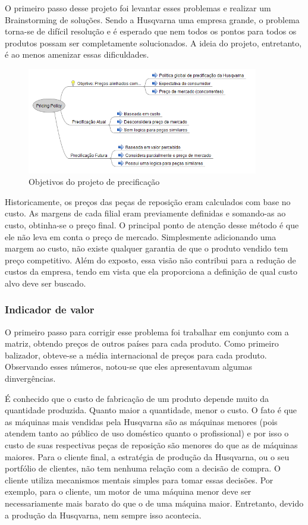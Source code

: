 \documentclass[12pt]{article}
\begin{document}
	O primeiro passo desse projeto foi levantar esses problemas e realizar um Brainstorming de soluções. Sendo a Husqvarna uma empresa grande, o problema torna-se de difícil resolução e é esperado que nem todos os pontos para todos os produtos possam ser completamente solucionados. A ideia do projeto, entretanto, é ao menos amenizar essas dificuldades.

\begin{figure}[h!]
	\centering
	\includegraphics[width=0.9\textwidth]{img/pricing.png}
	\caption{Objetivos do projeto de precificação}
	\label{fig:pricing}
\end{figure}

	Historicamente, os preços das peças de reposição eram calculados com base no custo. As margens de cada filial eram previamente definidas e somando-as ao custo, obtinha-se o preço final. O principal ponto de atenção desse método é que ele não leva em conta o preço de mercado. Simplesmente adicionando uma margem ao custo, não existe qualquer garantia de que o produto vendido tem preço competitivo. Além do exposto, essa visão não contribui para a redução de custos da empresa, tendo em vista que ela proporciona a definição de qual custo alvo deve ser buscado.

\subsubsection{Indicador de valor}

	O primeiro passo para corrigir esse problema foi trabalhar em conjunto com a matriz, obtendo preços de outros países para cada produto. Como primeiro balizador, obteve-se a média internacional de preços para cada produto. Observando esses números, notou-se que eles apresentavam algumas dinvergências.

	É conhecido que o custo de fabricação de um produto depende muito da quantidade produzida. Quanto maior a quantidade, menor o custo. O fato é que as máquinas mais vendidas pela Husqvarna são as máquinas menores (pois atendem tanto ao público de uso doméstico quanto o profissional) e por isso o custo de suas respectivas peças de reposição são menores do que as de máquinas maiores. Para o cliente final, a estratégia de produção da Husqvarna, ou o seu portfólio de clientes, não tem nenhuma relação com a decisão de compra. O cliente utiliza mecanismos mentais simples para tomar essas decisões. Por exemplo, para o cliente, um motor de uma máquina menor deve ser necessariamente mais barato do que o de uma máquina maior. Entretanto, devido a produção da Husqvarna, nem sempre isso acontecia.
\end{document}
